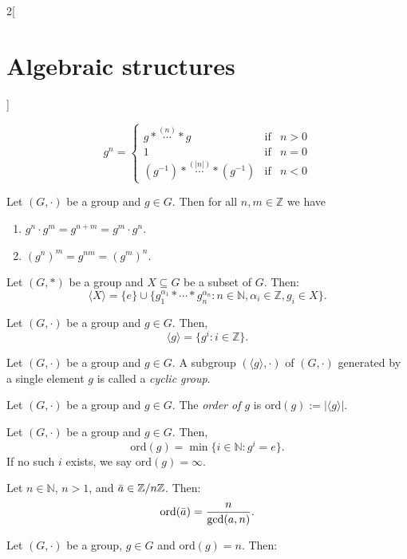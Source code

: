 \documentclass[../../../main.tex]{subfiles}
\begin{document}
\begin{multicols}{2}[\section{Algebraic structures}]
\begin{definition}
    $$g^n=\left\{
    \begin{array}{lll}
        g*\overset{(n)}{\cdots}* g & \text{if} & n>0  \\
        1 & \text{if} & n=0  \\
        (g^{-1})*\overset{(|n|)}{\cdots}*(g^{-1}) & \text{if} & n<0 
    \end{array}\right.$$
\end{definition}
\begin{lemma}
    Let $(G,\cdot)$ be a group and $g\in G$. Then for all $n,m\in\mathbb{Z}$ we have
    \begin{enumerate}
        \item $g^n\cdot g^m=g^{n+m}=g^m\cdot g^n$.
        \item $(g^n)^m=g^{nm}=(g^m)^n$.
    \end{enumerate}
\end{lemma}
\begin{prop}
    Let $(G,*)$ be a group and $X\subseteq G$ be a subset of $G$. Then: $$\langle X\rangle=\{e\}\cup\{g_1^{\alpha_1}*\cdots* g_n^{\alpha_n}:n\in\mathbb{N},\alpha_i\in\mathbb{Z},g_i\in X\}.$$
\end{prop}
\begin{corollary}
    Let $(G,\cdot)$ be a group and $g\in G$. Then, $$\langle g\rangle=\{g^i:i\in\mathbb{Z}\}.$$
\end{corollary}
\begin{definition}
    Let $(G,\cdot)$ be a group and $g\in G$. A subgroup $(\langle g\rangle,\cdot)$ of $(G,\cdot)$ generated by a single element $g$ is called a \textit{cyclic group}.
\end{definition}
\begin{definition}
    Let $(G,\cdot)$ be a group and $g\in G$. The \textit{order of $g$} is $\text{ord}(g):=|\langle g\rangle|$.
\end{definition}
\begin{prop}
    Let $(G,\cdot)$ be a group and $g\in G$. Then, $$\text{ord}(g)=\min\{i\in\mathbb{N}:g^i=e\}.$$ If no such $i$ exists, we say $\text{ord}(g)=\infty$.
\end{prop}
\begin{corollary}
    Let $n\in\mathbb{N}$, $n>1$, and $\Bar{a}\in\mathbb{Z}/n\mathbb{Z}$. Then: $$\text{ord}(\Bar{a})=\frac{n}{\gcd(a,n)}.$$
\end{corollary}
\begin{lemma}
    Let $(G,\cdot)$ be a group, $g\in G$ and $\text{ord}(g)=n$. Then:
    \begin{enumerate}

\end{enumerate}
\end{lemma}
\end{multicols}
\end{document}
